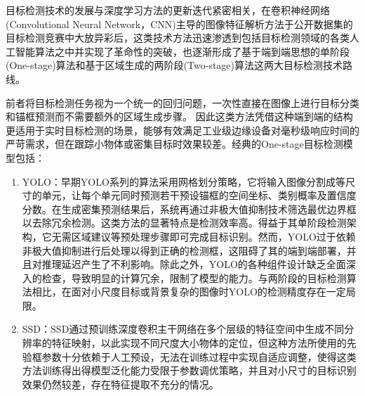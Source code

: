 目标检测技术的发展与深度学习方法的更新迭代紧密相关，在卷积神经网络(Convolutional Neural Network，CNN)\cite{taye2023theoretical}主导的图像特征解析方法于公开数据集的目标检测竞赛中大放异彩后，这类技术方法迅速渗透到包括目标检测领域的各类人工智能算法之中并实现了革命性的突破，也逐渐形成了基于端到端思想的单阶段(One-stage)算法和基于区域生成的两阶段(Two-stage)算法这两大目标检测技术路线。

前者将目标检测任务视为一个统一的回归问题，一次性直接在图像上进行目标分类和锚框预测而不需要额外的区域生成步骤。
因此这类方法凭借这种端到端的结构更适用于实时目标检测的场景，能够有效满足工业级边缘设备对毫秒级响应时间的严苛需求，但在跟踪小物体或密集目标时效果较差。经典的One-stage目标检测模型包括：
\begin{enumerate}[topsep = 0 pt, itemsep= 0 pt, parsep=0pt, partopsep=0pt, leftmargin=44pt, itemindent=0pt, labelsep=6pt, label=(\arabic*)]
    \item 	YOLO\cite{redmon2016you}：早期YOLO系列的算法采用网格划分策略，它将输入图像分割成等尺寸的单元，让每个单元同时预测若干预设锚框的空间坐标、类别概率及置信度分数。在生成密集预测结果后，系统再通过非极大值抑制技术筛选最优边界框以去除冗余检测。这类方法的显著特点是检测效率高。得益于其单阶段检测架构，它无需区域建议等预处理步骤即可完成目标识别。然而，YOLO过于依赖非极大值抑制进行后处理以得到正确的检测框，这阻碍了其的端到端部署，并且对推理延迟产生了不利影响。除此之外，YOLO的各种组件设计缺乏全面深入的检查，导致明显的计算冗余，限制了模型的能力。与两阶段的目标检测算法相比，在面对小尺度目标或背景复杂的图像时YOLO的检测精度存在一定局限。
    \item	SSD\cite{liu2016ssd}：SSD通过预训练深度卷积主干网络在多个层级的特征空间中生成不同分辨率的特征映射，以此实现不同尺度大小物体的定位，但这种方法所使用的先验框参数十分依赖于人工预设，无法在训练过程中实现自适应调整，使得这类方法训练得出得模型泛化能力受限于参数调优策略，并且对小尺寸的目标识别效果仍然较差，存在特征提取不充分的情况。
\end{enumerate}

